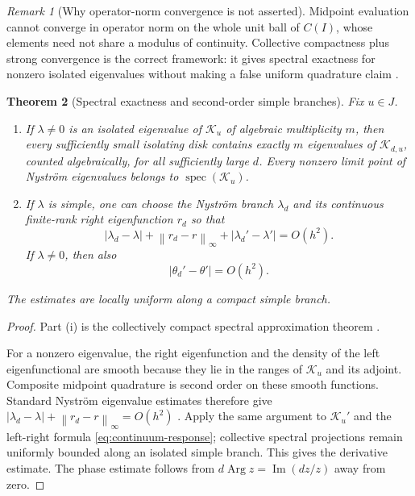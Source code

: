 \documentclass[11pt]{article}
\newtheorem{theorem}{Theorem}[section]
\theoremstyle{definition}
\theoremstyle{remark}
\newtheorem{remark}[theorem]{Remark}
\newcommand{\cK}{\mathcal K}
\newcommand{\spec}{\operatorname{spec}}
\newcommand{\Arg}{\operatorname{Arg}}
\newcommand{\norm}[1]{\left\lVert #1\right\rVert}
\begin{document}
\begin{remark}[Why operator-norm convergence is not asserted]
\label{rem:no-norm}
Midpoint evaluation cannot converge in operator norm on the whole unit ball
of $C(I)$, whose elements need not share a modulus of continuity.  Collective
compactness plus strong convergence is the correct framework: it gives
spectral exactness for nonzero isolated eigenvalues without making a false
uniform quadrature claim \citep{Anselone1971,Chatelin1983}.
\end{remark}

\begin{theorem}[Spectral exactness and second-order simple branches]
\label{thm:spectral-convergence}
Fix $u\in J$.
\begin{enumerate}[label=(\roman*),leftmargin=2.2em]
  \item If $\lambda\ne0$ is an isolated eigenvalue of $\cK_u$ of algebraic
  multiplicity $m$, then every sufficiently small isolating disk contains
  exactly $m$ eigenvalues of $\cK_{d,u}$, counted algebraically, for all
  sufficiently large $d$.  Every nonzero limit point of Nystr\"om
  eigenvalues belongs to $\spec(\cK_u)$.
  \item If $\lambda$ is simple, one can choose the Nystr\"om branch
  $\lambda_d$ and its continuous finite-rank right eigenfunction $r_d$ so that
  \begin{equation}\label{eq:second-order-spectral}
    |\lambda_d-\lambda|
    +\norm{r_d-r}_\infty
    +|\lambda_d'-\lambda'|
    =O(h^2).
  \end{equation}
  If $\lambda\ne0$, then also
  \begin{equation}\label{eq:phase-second-order}
    |\theta_d'-\theta'|=O(h^2).
  \end{equation}
\end{enumerate}
The estimates are locally uniform along a compact simple branch.
\end{theorem}

\begin{proof}
Part (i) is the collectively compact spectral approximation theorem
\citep{Anselone1971,Atkinson1967,Chatelin1983}.

For a nonzero eigenvalue, the right eigenfunction and the density of the left
eigenfunctional are smooth because they lie in the ranges of $\cK_u$ and
its adjoint.  Composite midpoint quadrature is second order on these smooth
functions.  Standard Nystr\"om eigenvalue estimates therefore give
$|\lambda_d-\lambda|+\norm{r_d-r}_\infty=O(h^2)$
\citep{Atkinson1967,Atkinson1997}.  Apply the same argument to $\cK_u'$ and
the left-right formula \eqref{eq:continuum-response}; collective spectral
projections remain uniformly bounded along an isolated simple branch.  This
gives the derivative estimate.  The phase estimate follows from
$d\Arg z=\operatorname{Im}(dz/z)$ away from zero.
\end{proof}
\end{document}
